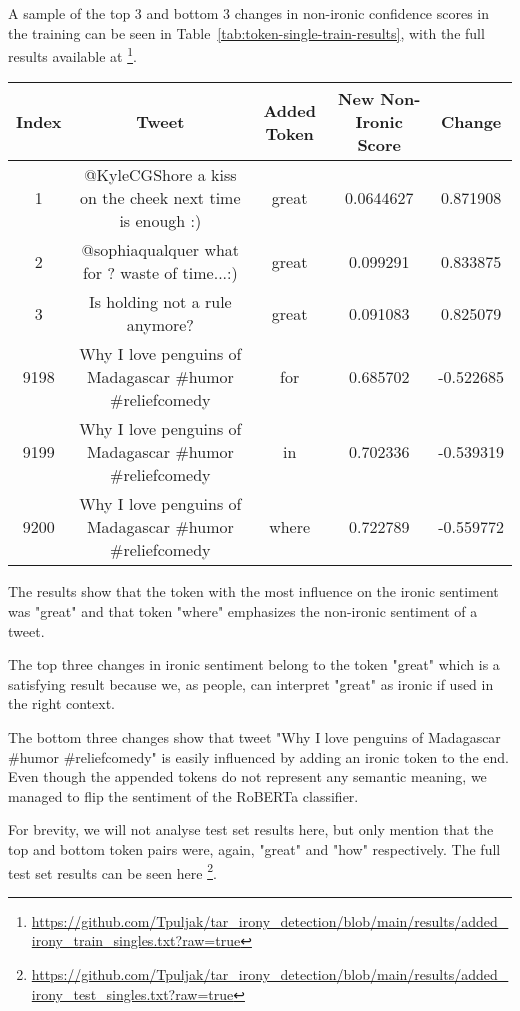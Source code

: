 \documentclass[10pt, a4paper]{article}
\begin{document}
A sample of the top 3 and bottom 3 changes in non-ironic confidence scores in the training can be seen in Table~\ref{tab:token-single-train-results}, with the full results available at \footnote{\url{https://github.com/Tpuljak/tar_irony_detection/blob/main/results/added_irony_train_singles.txt?raw=true}}.

\begin{table*}
\caption{Sample of Single Token Results on the Train Set}
\label{tab:token-single-train-results}
\begin{center}
\begin{tabular}{c|c|c|c|c}
\toprule
Index & Tweet & Added Token & New Non-Ironic Score & Change\\
\midrule
1     & @KyleCGShore a kiss on the cheek next time is enough :)   & great & 0.0644627 & 0.871908 \\
2     & @sophiaqualquer what for ? waste of time...:)             & great & 0.099291  & 0.833875 \\
3     & Is holding not a rule anymore?                            & great & 0.091083  & 0.825079 \\
9198  & Why I love penguins of Madagascar  \#humor \#reliefcomedy & for   & 0.685702  & -0.522685 \\
9199  & Why I love penguins of Madagascar  \#humor \#reliefcomedy & in    & 0.702336  & -0.539319 \\
9200  & Why I love penguins of Madagascar  \#humor \#reliefcomedy & where & 0.722789  & -0.559772 \\
\bottomrule
\end{tabular}
\end{center}
\end{table*}
  
The results show that the token with the most influence on the ironic sentiment was "great" and that token "where" emphasizes the non-ironic sentiment of a tweet.

The top three changes in ironic sentiment belong to the token "great" which is a satisfying result because we, as people, can interpret "great" as ironic if used in the right context.

The bottom three changes show that tweet "Why I love penguins of Madagascar  \#humor \#reliefcomedy" is easily influenced by adding an ironic token to the end.
Even though the appended tokens do not represent any semantic meaning, we managed to flip the sentiment of the RoBERTa classifier.

For brevity, we will not analyse test set results here, but only mention that the top and bottom token pairs were, again, "great" and "how" respectively.
The full test set results can be seen here \footnote{\url{https://github.com/Tpuljak/tar_irony_detection/blob/main/results/added_irony_test_singles.txt?raw=true}}.
\end{document}
